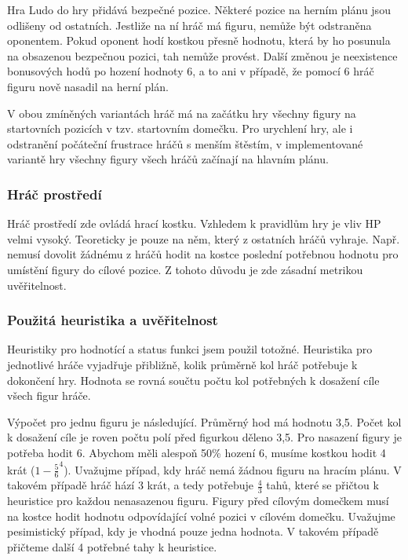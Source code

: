 Hra Ludo do hry přidává bezpečné pozice. Některé pozice na herním plánu jsou odlišeny od ostatních. Jestliže na ní hráč má figuru, nemůže být odstraněna oponentem. Pokud oponent hodí kostkou přesně hodnotu, která by ho posunula na obsazenou bezpečnou pozici, tah nemůže provést. Další změnou je neexistence bonusových hodů po hození hodnoty 6, a to ani v případě, že pomocí 6 hráč figuru nově nasadil na herní plán.

V obou zmíněných variantách hráč má na začátku hry všechny figury na startovních pozicích v tzv. startovním domečku. Pro urychlení hry, ale i odstranění počáteční frustrace hráčů s menším štěstím, v implementované variantě hry všechny figury všech hráčů začínají na hlavním plánu.

\subsubsection{Hráč prostředí}

Hráč prostředí zde ovládá hrací kostku. Vzhledem k pravidlům hry je vliv HP velmi vysoký. Teoreticky je pouze na něm, který z ostatních hráčů vyhraje. Např. nemusí dovolit žádnému z hráčů hodit na kostce poslední potřebnou hodnotu pro umístění figury do cílové pozice. Z tohoto důvodu je zde zásadní metrikou uvěřitelnost.

\subsubsection{Použitá heuristika a uvěřitelnost}

Heuristiky pro hodnotící a status funkci jsem použil totožné. Heuristika pro jednotlivé hráče vyjadřuje přibližně, kolik průměrně kol hráč potřebuje k dokončení hry. Hodnota se rovná součtu počtu kol potřebných k dosažení cíle všech figur hráče. 

Výpočet pro jednu figuru je následující. Průměrný hod má hodnotu 3,5. Počet kol k dosažení cíle je roven počtu polí před figurkou děleno 3,5. Pro nasazení figury je potřeba hodit 6. Abychom měli alespoň 50\% hození 6, musíme kostkou hodit 4 krát ($1-\frac{5}{6}^4$). Uvažujme případ, kdy hráč nemá žádnou figuru na hracím plánu. V takovém případě hráč hází 3 krát, a tedy potřebuje $\frac{4}{3}$ tahů, které se přičtou k heuristice pro každou nenasazenou figuru. Figury před cílovým domečkem musí na kostce hodit hodnotu odpovídající volné pozici v cílovém domečku. Uvažujme pesimistický případ, kdy je vhodná pouze jedna hodnota. V takovém případě přičteme další 4 potřebné tahy k heuristice.

